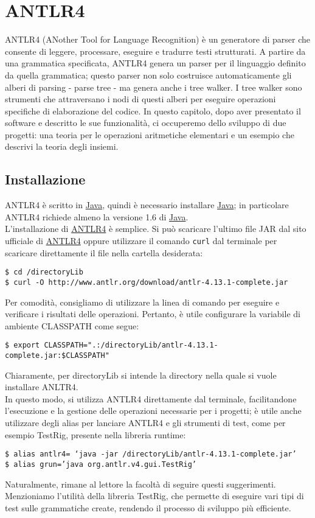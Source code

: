 \documentclass{article}
\newcommand{\JavaLink}{\href{https://www.oracle.com/java/technologies/javase-downloads.html}{Java}}
\newcommand{\ANTLRlink}{\href{http://www.antlr.org/download.html}{ANTLR4}}
\begin{document}
\section{ANTLR4}
ANTLR4 (ANother Tool for Language Recognition) è un generatore di parser che consente di leggere, processare, eseguire e tradurre testi strutturati. A partire da una grammatica specificata, ANTLR4 genera un parser per il linguaggio definito da quella grammatica; questo parser non solo costruisce automaticamente gli alberi di parsing - parse tree - ma genera anche i tree walker. I tree walker sono strumenti che attraversano i nodi di questi alberi per eseguire operazioni specifiche di elaborazione del codice. In questo capitolo, dopo aver presentato il software e descritto le sue funzionalità, ci occuperemo dello sviluppo di due progetti: una teoria per le operazioni aritmetiche elementari e un esempio che descrivi la teoria degli insiemi.
\subsection{Installazione}
ANTLR4 è scritto in \JavaLink, quindi è necessario installare \JavaLink; in particolare ANTLR4 richiede almeno la versione 1.6 di \JavaLink.\\
L'installazione di \ANTLRlink{}  è semplice. Si può scaricare l'ultimo file JAR dal sito ufficiale di \ANTLRlink{} oppure utilizzare il comando \texttt{curl} dal terminale per scaricare direttamente il file nella cartella desiderata:
\begin{verbatim}
$ cd /directoryLib
$ curl -O http://www.antlr.org/download/antlr-4.13.1-complete.jar
\end{verbatim}
\noindent
Per comodità, consigliamo di utilizzare la linea di comando per eseguire e verificare i risultati delle operazioni. Pertanto, è utile configurare la variabile di ambiente CLASSPATH come segue:
\begin{verbatim}
$ export CLASSPATH=".:/directoryLib/antlr-4.13.1-complete.jar:$CLASSPATH"
\end{verbatim}
Chiaramente, per directoryLib si intende la directory nella quale si vuole installare ANLTR4.
\\\noindent
In questo modo, si utilizza ANTLR4 direttamente dal terminale, facilitandone l'esecuzione e la gestione delle operazioni necessarie per i progetti; è utile anche utilizzare degli alias per lanciare ANTLR4 e gli strumenti di test, come per esempio TestRig, presente nella libreria runtime:
\begin{verbatim}
$ alias antlr4= ‘java -jar /directoryLib/antlr-4.13.1-complete.jar’
$ alias grun=’java org.antlr.v4.gui.TestRig’
\end{verbatim}
Naturalmente, rimane al lettore la facoltà di seguire questi suggerimenti.\\
Menzioniamo l'utilità della libreria TestRig, che permette di eseguire vari tipi di test sulle grammatiche create, rendendo il processo di sviluppo più efficiente.
\end{document}
